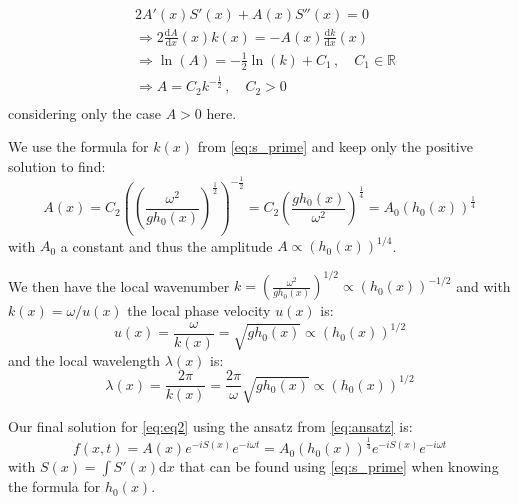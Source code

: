 \[
    \begin{aligned}
        & 2A'(x)S'(x) + A(x)S''(x) = 0 \\
        & \Rightarrow 2\frac{\mathrm{d}A}{\mathrm{d}x}(x)k(x) = - A(x) \frac{\mathrm{d}k}{\mathrm{d}x}(x) \\
        & \Rightarrow \ln(A) = -\frac{1}{2}\ln(k) + C_1\,, \quad C_1 \in \mathbb{R} \\
        & \Rightarrow A = C_2 k^{-\frac{1}{2}}\,, \quad C_2>0 \\
    \end{aligned}
\]
considering only the case $A > 0$ here.

We use the formula for $k(x)$ from \autoref{eq:s_prime} and keep only the positive solution to find:
\begin{equation}
    A(x) = C_2 \left(\left(\frac{\omega^2}{gh_0(x)}\right)^{\frac{1}{2}}\right)^{-\frac{1}{2}} = C_2 \left(\frac{gh_0(x)}{\omega^2}\right)^\frac{1}{4} = A_0 (h_0(x))^\frac{1}{4}
\end{equation}
with $A_0$ a constant and thus the amplitude $A \propto (h_0(x))^{1/4}$.

We then have the local wavenumber $k = \left(\frac{\omega^2}{gh_0(x)}\right)^{1/2} \propto (h_0(x))^{-1/2}$ and with $k(x) = \omega / u(x)$ the local phase velocity $u(x)$ is:
\begin{equation}
    u(x) = \frac{\omega}{k(x)} = \sqrt{gh_0(x)} \propto (h_0(x))^{1/2}
\end{equation}
and the local wavelength $\lambda(x)$ is:
\begin{equation}
    \lambda(x) = \frac{2\pi}{k(x)} = \frac{2\pi}{\omega}\sqrt{gh_0(x)}  \propto (h_0(x))^{1/2}
\end{equation}

Our final solution for \autoref{eq:eq2} using the ansatz from \autoref{eq:ansatz} is:
\begin{equation}
    f(x,t) = A(x)e^{-iS(x)}e^{-i\omega t} = A_0 (h_0(x))^\frac{1}{4}e^{-iS(x)}e^{-i\omega t}
\end{equation}
with $S(x) = \int S'(x) \mathrm{d}x$ that can be found using \autoref{eq:s_prime} when knowing the formula for $h_0(x)$.


